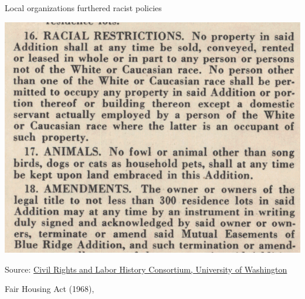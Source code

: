 \documentclass{beamer}
\newcommand\bref[2]{\href{#1}{\color{blue}{#2}}}
\begin{document}
\begin{frame}{Local organizations furthered racist policies}

\includegraphics[width = .7\textwidth]{figures/racial_covenant}

\begin{footnotesize}
Source: \href{https://depts.washington.edu/covenants/segregation.shtml}{Civil Rights and Labor History Consortium, University of Washington}
\end{footnotesize}
\end{frame}

\begin{frame}{Fair Housing Act (1968)}{\bref{https://fairhousingnj.org/2019/07/02/the-fair-housing-act/}{image source}, \bref{https://www.history.com/videos/fair-housing-act-of-1968}{video}}


\end{frame}
\end{document}
